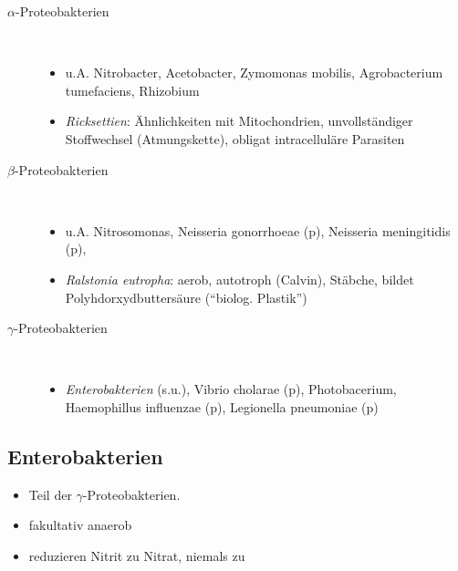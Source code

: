 \begin{description}
	\item[$\alpha$-Proteobakterien]\hfill \\
		\begin{itemize}
			\item u.A. Nitrobacter, Acetobacter, Zymomonas mobilis,
				Agrobacterium tumefaciens, Rhizobium
			\item \textsl{Ricksettien}: Ähnlichkeiten mit Mitochondrien, unvollständiger Stoffwechsel
				(Atmungskette), obligat intracelluläre Parasiten
		\end{itemize}
	\item[$\beta$-Proteobakterien]\hfill \\
		\begin{itemize}
			\item u.A. Nitrosomonas, Neisseria gonorrhoeae (p), Neisseria meningitidis (p),
			\item \textsl{Ralstonia eutropha}: aerob, autotroph (Calvin), Stäbche,
				bildet Polyhdorxydbuttersäure (``biolog. Plastik'')
		\end{itemize}
	\item[$\gamma$-Proteobakterien]\hfill \\
		\begin{itemize}
			\item \emph{Enterobakterien} (s.u.), Vibrio cholarae (p), Photobacerium,
				Haemophillus influenzae (p), Legionella pneumoniae (p)
		\end{itemize}
\end{description}

\subsection{Enterobakterien}
\begin{itemize}
	\item Teil der $\gamma$-Proteobakterien.
	\item fakultativ anaerob
	\item reduzieren Nitrit zu Nitrat, niemals zu 
\end{itemize}
